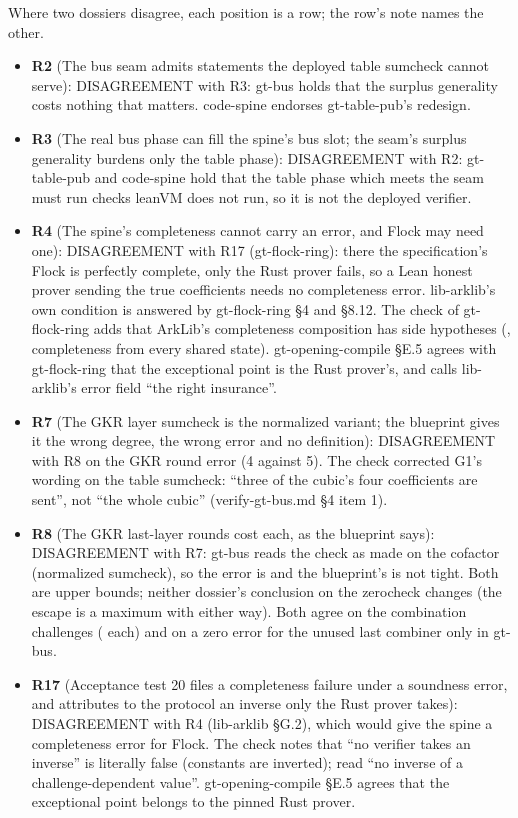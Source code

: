 Where two dossiers disagree, each position is a row; the row's note names the other.
\begin{itemize}
\item \textbf{R2} (The bus seam admits statements the deployed table sumcheck cannot serve): DISAGREEMENT with R3: gt-bus holds that the surplus generality costs nothing that matters. code-spine endorses gt-table-pub's redesign.
\item \textbf{R3} (The real bus phase can fill the spine's bus slot; the seam's surplus generality burdens only the table phase): DISAGREEMENT with R2: gt-table-pub and code-spine hold that the table phase which meets the seam must run checks leanVM does not run, so it is not the deployed verifier.
\item \textbf{R4} (The spine's completeness cannot carry an error, and Flock may need one): DISAGREEMENT with R17 (gt-flock-ring): there the specification's Flock is perfectly complete, only the Rust prover fails, so a Lean honest prover sending the true coefficients needs no completeness error. lib-arklib's own condition is answered by gt-flock-ring §4 and §8.12. The check of gt-flock-ring adds that ArkLib's completeness composition has side hypotheses (, completeness from every shared state). gt-opening-compile §E.5 agrees with gt-flock-ring that the exceptional point is the Rust prover's, and calls lib-arklib's error field ``the right insurance''.
\item \textbf{R7} (The GKR layer sumcheck is the normalized variant; the blueprint gives it the wrong degree, the wrong error and no definition): DISAGREEMENT with R8 on the GKR round error (4 against 5). The check corrected G1's wording on the table sumcheck: ``three of the cubic's four coefficients are sent'', not ``the whole cubic'' (verify-gt-bus.md §4 item 1).
\item \textbf{R8} (The GKR last-layer rounds cost  each, as the blueprint says): DISAGREEMENT with R7: gt-bus reads the check as made on the cofactor (normalized sumcheck), so the error is  and the blueprint's  is not tight. Both are upper bounds; neither dossier's conclusion on the zerocheck changes (the escape is a maximum with  either way). Both agree on the combination challenges ( each) and on a zero error for the unused last combiner only in gt-bus.
\item \textbf{R17} (Acceptance test 20 files a completeness failure under a soundness error, and attributes to the protocol an inverse only the Rust prover takes): DISAGREEMENT with R4 (lib-arklib §G.2), which would give the spine a completeness error for Flock. The check notes that ``no verifier takes an inverse'' is literally false (constants are inverted); read ``no inverse of a challenge-dependent value''. gt-opening-compile §E.5 agrees that the exceptional point belongs to the pinned Rust prover.
\end{itemize}

